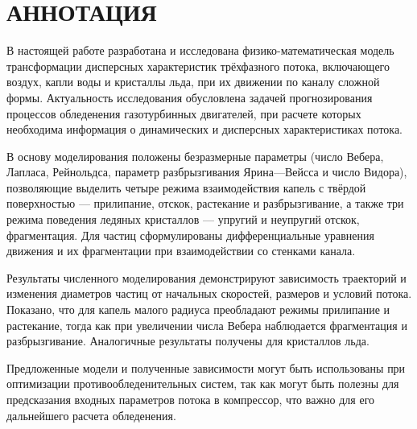 \chapter*{АННОТАЦИЯ}

В настоящей работе разработана и исследована физико-математическая модель трансформации дисперсных характеристик трёхфазного потока, включающего воздух, капли воды и кристаллы льда, при их движении по каналу сложной формы. Актуальность исследования обусловлена задачей прогнозирования процессов обледенения газотурбинных двигателей, при расчете которых необходима информация о динамических и дисперсных характеристиках потока.

В основу моделирования положены безразмерные параметры (число Вебера, Лапласа, Рейнольдса, параметр разбрызгивания Ярина—Вейсса и число Видора), позволяющие выделить четыре режима взаимодействия капель с твёрдой поверхностью — прилипание, отскок, растекание и разбрызгивание, а также три режима поведения ледяных кристаллов — упругий и неупругий отскок, фрагментация. Для частиц сформулированы дифференциальные уравнения движения и их фрагментации при взаимодействии со стенками канала.

Результаты численного моделирования демонстрируют зависимость траекторий и изменения диаметров частиц от начальных скоростей, размеров и условий потока. Показано, что для капель малого радиуса преобладают режимы прилипание и растекание, тогда как при увеличении числа Вебера наблюдается фрагментация и разбрызгивание. Аналогичные результаты получены для кристаллов льда.

Предложенные модели и полученные зависимости могут быть использованы при оптимизации противообледенительных систем, так как могут быть полезны для предсказания входных параметров потока в компрессор, что важно для его дальнейшего расчета обледенения.

\newpage 